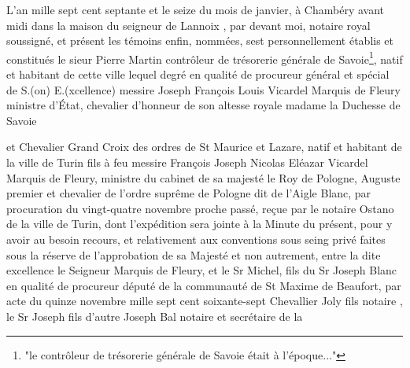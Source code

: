 \documentclass[a4paper,twoside,openany]{article}
\begin{document}
L'an mille sept cent septante et le seize du mois
de janvier, à Chambéry avant midi dans la
maison du seigneur de Lannoix  , par devant
moi, notaire royal soussigné, et présent les témoins 
enfin,  nommées, sest  personnellement établis
et constitués le sieur Pierre Martin contrôleur de 
trésorerie  générale de Savoie\footnote{"le contrôleur de 
trésorerie  générale de Savoie était à l'époque..."},  natif et habitant
de cette ville lequel degré en qualité de procureur
général et spécial de S.(on) E.(xcellence) messire Joseph 
François Louis Vicardel  Marquis de Fleury 
ministre d'État, chevalier d'honneur de son
altesse royale madame la Duchesse de Savoie


et Chevalier Grand Croix des ordres de St Maurice 
et Lazare, natif et habitant de la ville de Turin
fils à feu messire François Joseph Nicolas Eléazar
Vicardel Marquis de Fleury, 
ministre du cabinet de sa majesté le Roy de 
Pologne, Auguste premier et chevalier de l’ordre 
suprême de Pologne dit de l’Aigle Blanc, par 
procuration du vingt-quatre novembre proche 
passé, reçue par le notaire Ostano de la ville de 
Turin, dont l’expédition sera jointe à la Minute 
du présent, pour y avoir au besoin recours, et 
relativement aux conventions sous seing privé
faites sous la réserve de l’approbation de sa Majesté 
et non autrement, entre la dite excellence le Seigneur 
Marquis de Fleury, et le Sr Michel, fils du Sr 
Joseph Blanc en qualité de procureur député 
de la communauté de St Maxime de Beaufort, 
par acte du quinze novembre mille sept cent 
soixante-sept Chevallier Joly fils notaire , le Sr Joseph 
fils d’autre Joseph Bal notaire  et secrétaire de la 


\end{document}
